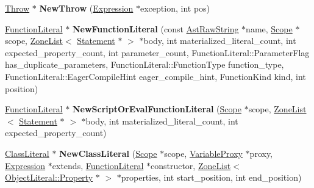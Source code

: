 \begin{DoxyCompactItemize}
\item 
\hyperlink{classv8_1_1internal_1_1_throw}{Throw} $\ast$ {\bfseries New\+Throw} (\hyperlink{classv8_1_1internal_1_1_expression}{Expression} $\ast$exception, int pos)\hypertarget{classv8_1_1internal_1_1_b_a_s_e___e_m_b_e_d_d_e_d_a74e0493a4069f9899b1dc443eeac9793}{}\label{classv8_1_1internal_1_1_b_a_s_e___e_m_b_e_d_d_e_d_a74e0493a4069f9899b1dc443eeac9793}

\item 
\hyperlink{classv8_1_1internal_1_1_function_literal}{Function\+Literal} $\ast$ {\bfseries New\+Function\+Literal} (const \hyperlink{classv8_1_1internal_1_1_ast_raw_string}{Ast\+Raw\+String} $\ast$name, \hyperlink{classv8_1_1internal_1_1_scope}{Scope} $\ast$scope, \hyperlink{classv8_1_1internal_1_1_zone_list}{Zone\+List}$<$ \hyperlink{classv8_1_1internal_1_1_statement}{Statement} $\ast$ $>$ $\ast$body, int materialized\+\_\+literal\+\_\+count, int expected\+\_\+property\+\_\+count, int parameter\+\_\+count, Function\+Literal\+::\+Parameter\+Flag has\+\_\+duplicate\+\_\+parameters, Function\+Literal\+::\+Function\+Type function\+\_\+type, Function\+Literal\+::\+Eager\+Compile\+Hint eager\+\_\+compile\+\_\+hint, Function\+Kind kind, int position)\hypertarget{classv8_1_1internal_1_1_b_a_s_e___e_m_b_e_d_d_e_d_a5b464d77bbca26ed05dad4d3d215d59e}{}\label{classv8_1_1internal_1_1_b_a_s_e___e_m_b_e_d_d_e_d_a5b464d77bbca26ed05dad4d3d215d59e}

\item 
\hyperlink{classv8_1_1internal_1_1_function_literal}{Function\+Literal} $\ast$ {\bfseries New\+Script\+Or\+Eval\+Function\+Literal} (\hyperlink{classv8_1_1internal_1_1_scope}{Scope} $\ast$scope, \hyperlink{classv8_1_1internal_1_1_zone_list}{Zone\+List}$<$ \hyperlink{classv8_1_1internal_1_1_statement}{Statement} $\ast$ $>$ $\ast$body, int materialized\+\_\+literal\+\_\+count, int expected\+\_\+property\+\_\+count)\hypertarget{classv8_1_1internal_1_1_b_a_s_e___e_m_b_e_d_d_e_d_a4d69e15490dfc0351e055158e56ec9be}{}\label{classv8_1_1internal_1_1_b_a_s_e___e_m_b_e_d_d_e_d_a4d69e15490dfc0351e055158e56ec9be}

\item 
\hyperlink{classv8_1_1internal_1_1_class_literal}{Class\+Literal} $\ast$ {\bfseries New\+Class\+Literal} (\hyperlink{classv8_1_1internal_1_1_scope}{Scope} $\ast$scope, \hyperlink{classv8_1_1internal_1_1_variable_proxy}{Variable\+Proxy} $\ast$proxy, \hyperlink{classv8_1_1internal_1_1_expression}{Expression} $\ast$extends, \hyperlink{classv8_1_1internal_1_1_function_literal}{Function\+Literal} $\ast$constructor, \hyperlink{classv8_1_1internal_1_1_zone_list}{Zone\+List}$<$ \hyperlink{classv8_1_1internal_1_1_object_literal_property}{Object\+Literal\+::\+Property} $\ast$ $>$ $\ast$properties, int start\+\_\+position, int end\+\_\+position)\hypertarget{classv8_1_1internal_1_1_b_a_s_e___e_m_b_e_d_d_e_d_a031abe3daf24e5db64a380e7103c2b0e}{}\label{classv8_1_1internal_1_1_b_a_s_e___e_m_b_e_d_d_e_d_a031abe3daf24e5db64a380e7103c2b0e}


\end{DoxyCompactItemize}

